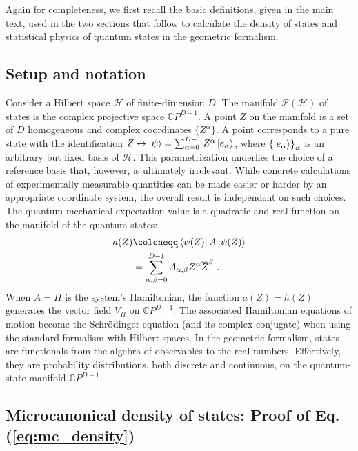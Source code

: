 \documentclass[draft,nofootinbib,pre,twocolumn,showpacs,showkeys,groupaddress,preprintnumbers,floatfix]{revtex4-1}
\newcommand{\1}{\mathbbm{1}}
\begin{document}
Again for completeness, we first recall the basic definitions, given in the
main text, used in the two sections that follow to calculate the density of
states and statistical physics of quantum states in the geometric formalism.

\subsection{Setup and notation}

Consider a Hilbert space $\mathcal{H}$ of finite-dimension $D$. The manifold
$\mathcal{P}(\mathcal{H})$ of states is the complex projective space
$\mathbb{C}P^{D-1}$. A point $Z$ on the manifold is a set of $D$ homogeneous and
complex coordinates $\{ Z^\alpha \}$. A point corresponds to a pure state with the
identification $Z \leftrightarrow \ket{\psi} = \sum_{\alpha=0}^{D-1}Z^\alpha
\ket{e_\alpha}$, where $\left\{\ket{e_\alpha}\right\}_\alpha$ is an arbitrary
but fixed basis of $\mathcal{H}$. This parametrization underlies the choice of
a reference basis that, however, is ultimately irrelevant. While concrete
calculations of experimentally measurable quantities can be made easier or
harder by an appropriate coordinate system, the overall result is independent
on such choices. The quantum mechanical expectation value is a quadratic and
real function on the manifold of the quantum states:
\begin{align*}
a(Z) & \coloneqq \bra{\psi(Z)}A\ket{\psi(Z)} \\
  & = \sum_{\alpha,\beta=0}^{D-1} A_{\alpha,\beta}Z^\alpha \overline{Z}^\beta
  ~.
\end{align*}
When $A=H$ is the system's Hamiltonian, the function $a(Z) = h(Z)$ generates the
vector field $V_H$ on $\mathbb{C}P^{D-1}$. The associated Hamiltonian equations
of motion become the Schr\"odinger equation (and its complex conjugate) when
using the standard formalism with Hilbert spaces. In the geometric formalism,
states are functionals from the algebra of observables to the real numbers.
Effectively, they are probability distributions, both discrete and continuous,
on the quantum-state manifold $\mathbb{C}P^{D-1}$.

\subsection{Microcanonical density of states: Proof of Eq. (\ref{eq:mc_density})}
\end{document}
